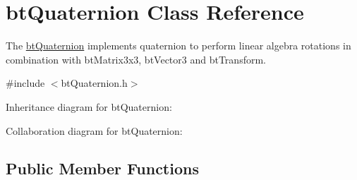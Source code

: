 \hypertarget{classbt_quaternion}{\section{bt\+Quaternion Class Reference}
\label{classbt_quaternion}
}


The \hyperlink{classbt_quaternion}{bt\+Quaternion} implements quaternion to perform linear algebra rotations in combination with bt\+Matrix3x3, bt\+Vector3 and bt\+Transform.  




{\ttfamily \#include $<$bt\+Quaternion.\+h$>$}



Inheritance diagram for bt\+Quaternion\+:


Collaboration diagram for bt\+Quaternion\+:
\subsection*{Public Member Functions}
